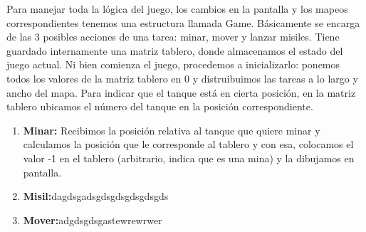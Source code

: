 Para manejar toda la lógica del juego, los cambios en la pantalla y los mapeos correspondientes tenemos una estructura
llamada Game. Básicamente se encarga de las 3 posibles acciones de una tarea: minar, mover y lanzar misiles.
Tiene guardado internamente una matriz tablero, donde almacenamos el estado del juego actual. 
Ni bien comienza el juego, procedemos a inicializarlo: ponemos todos los valores de la matriz tablero en 0
y distruibuimos las tareas a lo largo y ancho del mapa. Para indicar que el tanque está en cierta posición,
en la matriz tablero ubicamos el número del tanque en la posición correspondiente.

\begin{enumerate}
 \item \textbf{Minar:} Recibimos la posición relativa al tanque que quiere minar y calculamos la posición que le corresponde
 al tablero y con esa, colocamos el valor -1 en el tablero (arbitrario, indica que es una mina) y la dibujamos en pantalla.
 \item \textbf{Misil:}dagdsgadsgdsgdsgdsgdsgds
 \item \textbf{Mover:}adgdsgdsgastewrewrwer
\end{enumerate}
